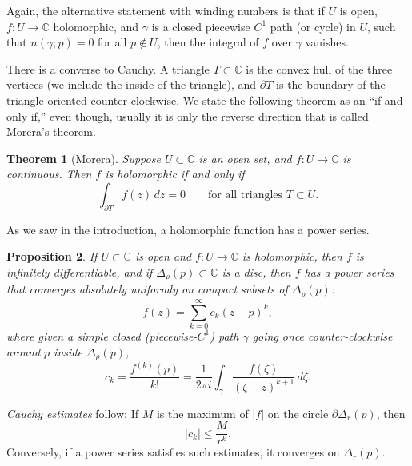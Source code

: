 \documentclass[12pt,openany]{book}
\newcommand{\sabs}[1]{\lvert {#1} \rvert}
\newcommand{\C}{{\mathbb{C}}}
\newcommand{\myindex}[1]{#1\index{#1}}
\theoremstyle{plain}
\newtheorem{thm}{Theorem}[section]
\newtheorem{prop}[thm]{Proposition}
\theoremstyle{remark}
\theoremstyle{definition}
\theoremstyle{exercise}
\theoremstyle{example}
\begin{document}
Again, the alternative statement with winding numbers
 is that if $U$ is open, $f \colon U \to \C$ holomorphic, and $\gamma$ is
a closed piecewise $C^1$ path (or cycle) in $U$, such that
$n(\gamma;p) = 0$ for all $p \not\in U$, then
the integral of $f$ over $\gamma$ vanishes.

There is a converse to Cauchy.  A triangle $T \subset \C$ is
the convex hull of the three vertices (we include the inside of the
triangle), and $\partial T$ is the boundary of the triangle oriented
counter-clockwise.  We state the following theorem as an
``if and only if,'' even though, usually it is only the reverse direction that
is called Morera's theorem.

\begin{thm}[Morera] \label{thm:onevarmorera}
Suppose $U \subset \C$ is an open set, and $f \colon U \to \C$
is continuous.  Then $f$ is holomorphic
if and only if
\begin{equation*}
\int_{\partial T} f(z) \, dz = 0
\qquad
\text{for all triangles } T \subset U.
\end{equation*}
\end{thm}

As we saw in the introduction, a holomorphic function has a power series.

\begin{prop}
If $U \subset \C$ is open and $f \colon U \to \C$ is holomorphic,
then $f$ is infinitely differentiable, and if $\Delta_\rho(p) \subset \C$
is a disc, then $f$ has a power series that
converges absolutely uniformly on compact subsets of $\Delta_\rho(p)$:
\begin{equation*}
f(z) = \sum_{k=0}^\infty c_k {(z-p)}^k ,
\end{equation*}
where given a simple closed (piecewise-$C^1$) path $\gamma$
going once counter-clockwise
around $p$ inside $\Delta_\rho(p)$,
\begin{equation*}
c_k = \frac{f^{(k)}(p)}{k!} =
\frac{1}{2\pi i}
\int_{\gamma}
\frac{f(\zeta)}{{(\zeta-z)}^{k+1}}
\,
d \zeta  .
\end{equation*}
\end{prop}

\emph{\myindex{Cauchy estimates}} follow:  If $M$
is the maximum of $\sabs{f}$ on the circle $\partial \Delta_r(p)$, then
\begin{equation*}
\sabs{c_k} \leq \frac{M}{r^k} .
\end{equation*}
Conversely, if a power series satisfies such estimates,
it converges on $\Delta_r(p)$.
\end{document}
